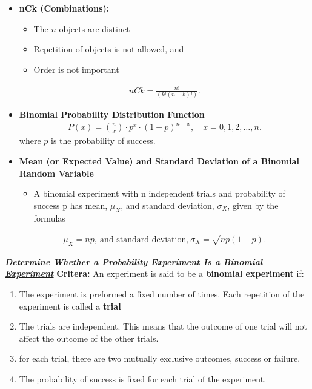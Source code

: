 \documentclass{report}
\begin{document}
      \begin{itemize}
          \item \textbf{nCk (Combinations):}
              \begin{itemize}
                  \item The  $n$  objects are distinct
                  \item Repetition of objects is not allowed, and
                  \item Order is not important
              \end{itemize}
              \begin{align*}
                  nCk = \frac{n!}{(k!(n-k)!)}
              .\end{align*}
            \item \textbf{Binomial Probability Distribution Function}
                \begin{align*}
                    P(x) = \binom{n}{x} \cdot p^x \cdot (1 - p)^{n-x}, \quad x = 0, 1, 2, \ldots, n
                .\end{align*}
                where $p$ is the probability of success.
            \item \textbf{Mean (or Expected Value) and Standard Deviation of a Binomial Random Variable}
                \begin{itemize}
                    \item A binomial experiment with n independent trials and probability of success p has mean, $\mu_X$, and standard deviation, $\sigma_X$, given by the formulas
                \end{itemize}
                \begin{align*}
                    \mu_X = np,\ \text{and standard deviation,}\ \sigma_X = \sqrt{np(1-p)}
                .\end{align*}
      \end{itemize}

      \pagebreak \bigbreak \noindent 
      \textbf{\textit{\underline{Determine Whether a Probability Experiment Is a Binomial Experiment}}}
      \bigbreak \noindent 
      \textbf{Critera:}
      \bigbreak \noindent 
      An experiment is said to be a \textbf{binomial experiment} if:
      \begin{enumerate}
          \item The experiment is preformed a fixed number of times. Each repetition of the experiment is called a \textbf{trial}
            \item The trials are independent. This means that the outcome of one trial will not affect the outcome of the other trials.
            \item for each trial, there are two mutually exclusive outcomes, success or failure.
            \item The probability of success is fixed for each trial of the experiment.
      \end{enumerate}
\end{document}
